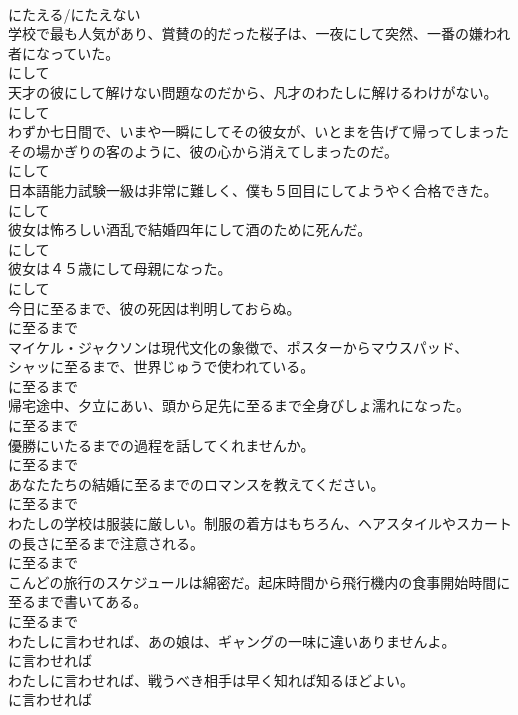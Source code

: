 \documentclass[8pt]{extreport}
\begin{document}
\begin{CJK}{UTF8}{min}
\\	にたえる/にたえない
\\	学校で最も人気があり、賞賛の的だった桜子は、一夜にして突然、一番の嫌われ者になっていた。	
\\	にして
\\	天才の彼にして解けない問題なのだから、凡才のわたしに解けるわけがない。	
\\	にして
\\	わずか七日間で、いまや一瞬にしてその彼女が、いとまを告げて帰ってしまったその場かぎりの客のように、彼の心から消えてしまったのだ。	
\\	にして
\\	日本語能力試験一級は非常に難しく、僕も５回目にしてようやく合格できた。	
\\	にして
\\	彼女は怖ろしい酒乱で結婚四年にして酒のために死んだ。	
\\	にして
\\	彼女は４５歳にして母親になった。	
\\	にして
\\	今日に至るまで、彼の死因は判明しておらぬ。	
\\	に至るまで
\\	マイケル・ジャクソンは現代文化の象徴で、ポスターからマウスパッド、
\\	シャッに至るまで、世界じゅうで使われている。	
\\	に至るまで
\\	帰宅途中、夕立にあい、頭から足先に至るまで全身びしょ濡れになった。	
\\	に至るまで
\\	優勝にいたるまでの過程を話してくれませんか。	
\\	に至るまで
\\	あなたたちの結婚に至るまでのロマンスを教えてください。	
\\	に至るまで
\\	わたしの学校は服装に厳しい。制服の着方はもちろん、ヘアスタイルやスカートの長さに至るまで注意される。	
\\	に至るまで
\\	こんどの旅行のスケジュールは綿密だ。起床時間から飛行機内の食事開始時間に至るまで書いてある。	
\\	に至るまで
\\	わたしに言わせれば、あの娘は、ギャングの一味に違いありませんよ。	
\\	に言わせれば
\\	わたしに言わせれば、戦うべき相手は早く知れば知るほどよい。	
\\	に言わせれば

\end{CJK}
\end{document}
